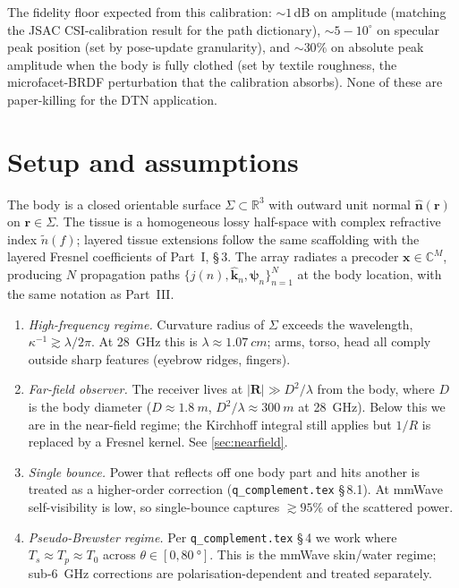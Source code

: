 \documentclass[11pt,a4paper]{article}
\theoremstyle{definition}
\newcommand{\khat}{\hat{\bm{k}}}
\newcommand{\nhat}{\hat{\bm{n}}}
\newcommand{\rr}{\mathbf{r}}
\newcommand{\Complex}{\mathbb{C}}
\begin{document}
The fidelity floor expected from this calibration: $\sim 1$\,dB
on amplitude (matching the JSAC CSI-calibration result for the path
dictionary), $\sim 5{-}10^\circ$ on specular peak position (set by
pose-update granularity), and $\sim 30\%$ on absolute peak amplitude
when the body is fully clothed (set by textile roughness, the
microfacet-BRDF perturbation that the calibration absorbs).  None of
these are paper-killing for the DTN application.

\section{Setup and assumptions}\label{sec:setup}

The body is a closed orientable surface
$\Sigma\subset\mathbb{R}^3$ with outward unit normal $\nhat(\rr)$ on
$\rr\in\Sigma$.  The tissue is a homogeneous lossy half-space with
complex refractive index $\tilde n(f)$; layered tissue extensions
follow the same scaffolding with the layered Fresnel coefficients of
Part~I, \S\,3.  The array radiates a precoder
$\mathbf{x}\in\Complex^M$, producing $N$ propagation paths
$\{j(n),\khat_n,\bm\psi_n\}_{n=1}^N$ at the body location, with the
same notation as Part~III.

\begin{enumerate}[label=(A\arabic*),leftmargin=2.4em,itemsep=2pt]
\item\label{a:po} \emph{High-frequency regime.}
Curvature radius of $\Sigma$ exceeds the wavelength,
$\kappa^{-1}\gtrsim\lambda/2\pi$.  At \SI{28}{GHz} this is
$\lambda\approx\SI{1.07}{cm}$; arms, torso, head all comply outside
sharp features (eyebrow ridges, fingers).
\item\label{a:far} \emph{Far-field observer.}  The receiver lives at
$|\mathbf{R}|\gg D^2/\lambda$ from the body, where $D$ is the body
diameter ($D\approx\SI{1.8}{m}$, $D^2/\lambda\approx\SI{300}{m}$ at
\SI{28}{GHz}).  Below this we are in the near-field regime; the
Kirchhoff integral still applies but $1/R$ is replaced by a Fresnel
kernel.  See \cref{sec:nearfield}.
\item\label{a:single} \emph{Single bounce.}  Power that reflects off
one body part and hits another is treated as a higher-order
correction (\texttt{q\_complement.tex} \S\,8.1).  At mmWave
self-visibility is low, so single-bounce captures $\gtrsim 95\%$ of
the scattered power.
\item\label{a:pb} \emph{Pseudo-Brewster regime.}  Per
\texttt{q\_complement.tex} \S\,4 we work where $T_s\approx T_p\approx
T_0$ across $\theta\in[0,\SI{80}{\degree}]$.  This is the mmWave
skin/water regime; sub-\SI{6}{GHz} corrections are
polarisation-dependent and treated separately.
\end{enumerate}
\end{document}
